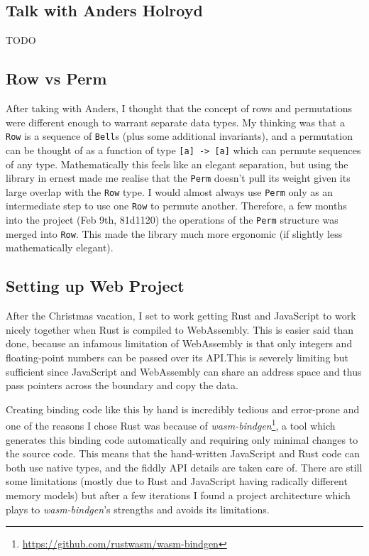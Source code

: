 \documentclass[12pt]{article}
\begin{document}
\subsection{Talk with Anders Holroyd}

TODO

\subsection{Row vs Perm}

After taking with Anders, I thought that the concept of rows and permutations were different enough
to warrant separate data types.  My thinking was that a \verb|Row| is a sequence of \verb|Bell|s
(plus some additional invariants), and a permutation can be thought of as a function of type
\verb|[a] -> [a]| which can permute sequences of any type.  Mathematically this feels like an
elegant separation, but using the library in ernest made me realise that the \verb|Perm| doesn't
pull its weight given its large overlap with the \verb|Row| type.  I would almost always use
\verb|Perm| only as an intermediate step to use one \verb|Row| to permute another.  Therefore, a few
months into the project (Feb 9th, 81d1120) the operations of the \verb|Perm| structure was merged
into \verb|Row|.  This made the library much more ergonomic (if slightly less mathematically
elegant).

\subsection{Setting up Web Project}

After the Christmas vacation, I set to work getting Rust and JavaScript to work nicely together when
Rust is compiled to WebAssembly.  This is easier said than done, because an infamous limitation of
WebAssembly is that only integers and floating-point numbers can be passed over its API.\@  This is
severely limiting but sufficient since JavaScript and WebAssembly can share an address space and
thus pass pointers across the boundary and copy the data.

Creating binding code like this by hand is incredibly tedious and error-prone and one of the reasons
I chose Rust was because of
\emph{wasm-bindgen}\footnote{\url{https://github.com/rustwasm/wasm-bindgen}}, a tool which generates
this binding code automatically and requiring only minimal changes to the source code.  This means
that the hand-written JavaScript and Rust code can both use native types, and the fiddly API details
are taken care of.  There are still some limitations (mostly due to Rust and JavaScript having
radically different memory models) but after a few iterations I found a project architecture which
plays to \emph{wasm-bindgen}'s strengths and avoids its limitations.
\end{document}
